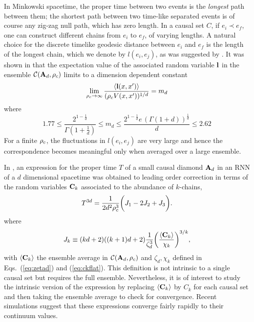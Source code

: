 In Minkowski spacetime, the proper time between two events is the 
\emph{longest} path between them; the shortest 
path between two time-like separated events  is of course any  zig-zag null path, which has zero length. In a causal set
$C$, if  $e_i \prec e_f$, one can construct different  chains from $e_i$ to $e_f$, of varying lengths. A  natural choice
for the discrete timelike geodesic
distance between $e_i$ and $e_f$ is  the length of the longest chain, which we denote by  $l(e_i,e_j)$, as was suggested
by \cite{myrheim}.  
It was shown  in  \cite{bg} that the expectation value of the associated random variable $\mathbf l$  in the ensemble $\mathcal C(\mathbf A_d,\rho_c)$  limits to a dimension dependent constant 
\begin{equation} 
\lim_{\rho_c \rightarrow \infty} \frac{\langle {\mathbf{l}(x,x')} \rangle} {(\rho_c  V(x,x'))^{1/d}} =   m_d  
\end{equation} 
where 
\begin{equation} 
1.77\leq\frac{2^{1-\frac{1}{d}}}{\Gamma(1+\frac{1}{d})}\leq
m_d\leq \frac{2^{1-\frac{1}{d}}e\,(\Gamma(1+d))^{\frac{1}{d}}}{d}\leq
         2.62 
\end{equation} 
For a finite  $\rho_c$, the fluctuations in $l(e_i,e_j)$ are  very  large \citep{meyer,bachmat} and hence the correspondence
becomes meaningful only when averaged over a large ensemble. 

In \cite{rss}, an expression for the proper time $T$ of 
a small causal diamond $\mathbf A_d$ in an RNN of a  $d$ dimensional spacetime was obtained to leading order correction in terms of the random
variables $\mathbf C_k$ associated to the abundance of $k$-chains,    
\begin{equation} 
\label{T}
T^{3d}=\frac{1}{2d^2 \rho_c^3}\biggl(J_1-2J_2+J_3 \biggr).   
\end{equation} 
where 
\begin{equation} 
\label{moreidentities}
J_k \equiv  (kd +2)  ((k+1)d+2) \frac{1}{\zeta_d^3}\biggl(\frac{\langle {\mathbf C_k} \rangle}{\chi_k }\biggr)^{3/k},  
\end{equation}
with $\langle {\mathbf C_k} \rangle$  the ensemble average in  $\mathcal C(\mathbf A_d,\rho_c)$ and $\zeta_d, \chi_k$ defined in Eqs.~(\ref{eq:zetad}) and
(\ref{eq:ckflat}). This definition is not intrinsic to a single causal set
but requires the full ensemble. Nevertheless, it is of interest to study the intrinsic version of the expression by
replacing  $\langle {\mathbf C_k} \rangle$ by   $C_k$ for each causal set and then taking the  ensemble average to check for
convergence.   Recent simulations suggest that these expressions converge fairly rapidly to their continuum values. 

